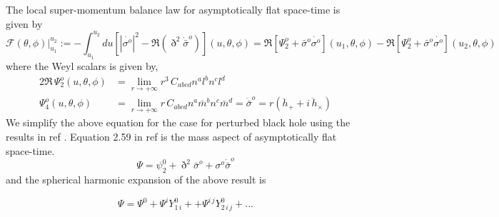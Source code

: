 \documentclass[prd,preprintnumbers,onecolumn,eqsecnum,floatfix,letter]{revtex4}
\begin{document}
The local super-momentum balance law for asymptotically flat space-time is given by 
\begin{equation}
\mathcal{F}(\theta,\phi) \Big|^{u_{2}}_{u_{1}}  := -\int_{u_{1}}^{u_{2}} du \left[|\dot{\sigma^{o}}|^{2} - \Re\left(\eth^{2}\dot{\bar{\sigma}}^{o} \right) \right](u, \theta, \phi) = \Re\left[\Psi^{o}_{2} + \bar{\sigma}^{o}\dot{\sigma^{o}}\right]\left(u_{1}, \theta, \phi\right) - \Re\left[\Psi^{o}_{2} + \bar{\sigma}^{o}\dot{\sigma^{o}}\right]\left(u_{2}, \theta, \phi\right) 
\label{superMomentumBalanceLaw}
\end{equation}
where the Weyl scalars is given by,
\begin{align}
	2 \Re\, \Psi^{o}_{2}\left(u, \theta, \phi \right) & = \lim_{r \to +\infty} r^{3} \, C_{abcd}n^{a}l^{b}n^{c}l^{d}\label{psi2}\\  \Psi^{o}_{4}\left(u, \theta, \phi \right) & = \lim_{r \to +\infty} r \, C_{abcd}n^{a}\bar{m}^{b}n^{c} \bar{m}^{d} = \ddot{\bar{\sigma}}^{o} = r\left(\ddot{h}_{+} + i\, \ddot{h}_{\times}  \right)
	\label{psi4}
\end{align}
We simplify the above equation for the case for perturbed black hole using the results in ref \cite{Adamo_2009}. Equation 2.59 in ref\cite{Adamo_2009} is the mass aspect of asymptotically flat space-time. 
\begin{equation}
	\Psi = \psi^{0}_{2} + \eth^{2}\bar{\sigma}^{o} + {\sigma}^{o}\dot{\bar{\sigma}}^{o}
\end{equation}
and the spherical harmonic expansion of the above result is

\begin{equation}
	\Psi = \Psi^{0} + \Psi^{i}Y^{0}_{1\,i} + + \Psi^{i\,j}Y^{0}_{2\,i\,j} + ...
\end{equation} 
\end{document}
